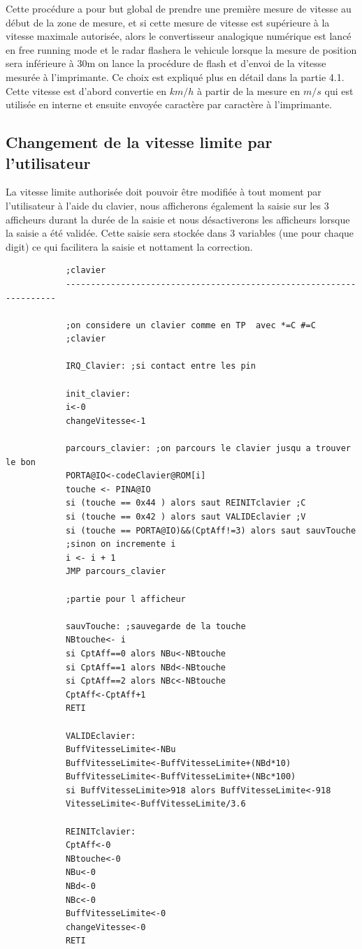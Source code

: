 \documentclass[a4paper, 12pt]{article}
\begin{document}
		Cette procédure a pour but global de prendre une première mesure de vitesse au début de la zone de mesure, et si cette mesure de vitesse est supérieure à la vitesse maximale autorisée, alors le convertisseur analogique numérique est lancé en free running mode et le radar flashera le vehicule lorsque la mesure de position sera inférieure à 30m on lance la procédure de flash et d'envoi de la vitesse mesurée à l'imprimante. Ce choix est expliqué plus en détail dans la partie 4.1.\\
		Cette vitesse est d'abord convertie en $km/h$ à partir de la mesure en $m/s$ qui est utilisée en interne et ensuite envoyée caractère par caractère à l'imprimante. 
		
		\subsection{Changement de la vitesse limite par l'utilisateur}
		La vitesse limite authorisée doit pouvoir être modifiée à tout moment par l'utilisateur à l'aide du clavier, nous afficherons également la saisie sur les 3 afficheurs durant la durée de la saisie et nous désactiverons les afficheurs lorsque la saisie a été validée. Cette saisie sera stockée dans 3 variables (une pour chaque digit) ce qui facilitera la saisie et nottament la correction.
		\begin{lstlisting}
			;clavier
			--------------------------------------------------------------------
			
			;on considere un clavier comme en TP  avec *=C #=C
			;clavier
			
			IRQ_Clavier: ;si contact entre les pin
			
			init_clavier:
			i<-0
			changeVitesse<-1
			
			parcours_clavier: ;on parcours le clavier jusqu a trouver le bon 
			PORTA@IO<-codeClavier@ROM[i]
			touche <- PINA@IO
			si (touche == 0x44 ) alors saut REINITclavier ;C
			si (touche == 0x42 ) alors saut VALIDEclavier ;V
			si (touche == PORTA@IO)&&(CptAff!=3) alors saut sauvTouche
			;sinon on incremente i
			i <- i + 1 
			JMP parcours_clavier
			
			;partie pour l afficheur 
			
			sauvTouche: ;sauvegarde de la touche 
			NBtouche<- i
			si CptAff==0 alors NBu<-NBtouche
			si CptAff==1 alors NBd<-NBtouche
			si CptAff==2 alors NBc<-NBtouche
			CptAff<-CptAff+1
			RETI
			
			VALIDEclavier:
			BuffVitesseLimite<-NBu
			BuffVitesseLimite<-BuffVitesseLimite+(NBd*10)
			BuffVitesseLimite<-BuffVitesseLimite+(NBc*100)
			si BuffVitesseLimite>918 alors BuffVitesseLimite<-918
			VitesseLimite<-BuffVitesseLimite/3.6
			
			REINITclavier:
			CptAff<-0
			NBtouche<-0 
			NBu<-0
			NBd<-0
			NBc<-0
			BuffVitesseLimite<-0
			changeVitesse<-0
			RETI
		\end{lstlisting}
		
\end{document}
